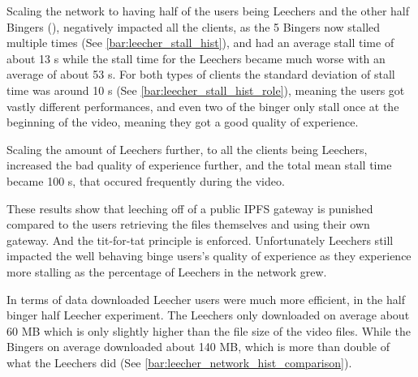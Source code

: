 




Scaling the network to having half of the users being Leechers and the other half Bingers (), negatively impacted all the clients, as the 5 Bingers now stalled multiple times (See \autoref{bar:leecher_stall_hist}), and had an average stall time of about 13 \ac{s} while the stall time for the Leechers became much worse with an average of about 53 \ac{s}. For both types of clients the standard deviation of stall time was around 10 \ac{s} (See \autoref{bar:leecher_stall_hist_role}), meaning the users got vastly different performances, and even two of the binger only stall once at the beginning of the video, meaning they got a good quality of experience.






%

Scaling the amount of Leechers further, to all the clients being Leechers, increased the bad quality of experience further, and the total mean stall time became 100 \ac{s}, that occured frequently during the video.

These results show that leeching off of a public \ac{IPFS} gateway is punished compared to the users retrieving the files themselves and using their own gateway. And the tit-for-tat principle is enforced. Unfortunately Leechers still impacted the well behaving binge users's quality of experience as they experience more stalling as the percentage of Leechers in the network grew.

In terms of data downloaded Leecher users were much more efficient, in the half binger half Leecher experiment. The Leechers only downloaded on average about 60 \ac{MB} which is only slightly higher than the file size of the video files. While the Bingers on average downloaded about 140 \ac{MB}, which is more than double of what the Leechers did (See \autoref{bar:leecher_network_hist_comparison}). 


